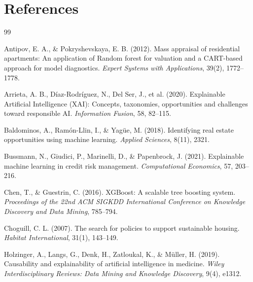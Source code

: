 \documentclass[12pt, a4paper]{article}
\begin{document}
\newpage
\section*{References}

\begingroup
\renewcommand{\section}[2]{}


\begin{thebibliography}{99}

Antipov, E. A., \& Pokryshevskaya, E. B. (2012).
Mass appraisal of residential apartments: An application of Random forest for valuation and a CART-based approach for model diagnostics.
\textit{Expert Systems with Applications}, 39(2), 1772--1778.

Arrieta, A. B., D{\'i}az-Rodr{\'i}guez, N., Del Ser, J., et al. (2020).
Explainable Artificial Intelligence (XAI): Concepts, taxonomies, opportunities and challenges toward responsible AI.
\textit{Information Fusion}, 58, 82--115.

Baldominos, A., Ram{\'o}n-Llin, I., \& Yag{\"u}e, M. (2018).
Identifying real estate opportunities using machine learning.
\textit{Applied Sciences}, 8(11), 2321.

Bussmann, N., Giudici, P., Marinelli, D., \& Papenbrock, J. (2021).
Explainable machine learning in credit risk management.
\textit{Computational Economics}, 57, 203--216.

Chen, T., \& Guestrin, C. (2016).
XGBoost: A scalable tree boosting system.
\textit{Proceedings of the 22nd ACM SIGKDD International Conference on Knowledge Discovery and Data Mining}, 785--794.

Choguill, C. L. (2007).
The search for policies to support sustainable housing.
\textit{Habitat International}, 31(1), 143--149.

Holzinger, A., Langs, G., Denk, H., Zatloukal, K., \& M{\"u}ller, H. (2019).
Causability and explainability of artificial intelligence in medicine.
\textit{Wiley Interdisciplinary Reviews: Data Mining and Knowledge Discovery}, 9(4), e1312.


\end{thebibliography}
\end{document}
